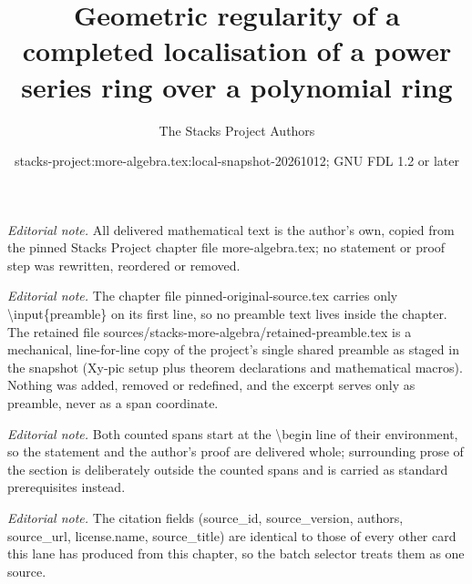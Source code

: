 \documentclass[10pt,a4paper]{amsart}
\title{Geometric regularity of a completed localisation of a power series ring over a polynomial ring}
\author{The Stacks Project Authors}
\date{stacks-project:more-algebra.tex:local-snapshot-20261012; GNU FDL 1.2 or later}
\theoremstyle{plain}
\theoremstyle{definition}
\theoremstyle{remark}
\numberwithin{equation}{subsection}
\begin{document}
\maketitle
\setcounter{subsection}{1}
\noindent\textit{Editorial note.} All delivered mathematical text is the author's own, copied from the pinned Stacks Project chapter file more-algebra.tex; no statement or proof step was rewritten, reordered or removed.\par\medskip
\noindent\textit{Editorial note.} The chapter file pinned-original-source.tex carries only \textbackslash{}input\{preamble\} on its first line, so no preamble text lives inside the chapter. The retained file sources/stacks-more-algebra/retained-preamble.tex is a mechanical, line-for-line copy of the project's single shared preamble as staged in the snapshot (Xy-pic setup plus theorem declarations and mathematical macros). Nothing was added, removed or redefined, and the excerpt serves only as preamble, never as a span coordinate.\par\medskip
\noindent\textit{Editorial note.} Both counted spans start at the \textbackslash{}begin line of their environment, so the statement and the author's proof are delivered whole; surrounding prose of the section is deliberately outside the counted spans and is carried as standard prerequisites instead.\par\medskip
\noindent\textit{Editorial note.} The citation fields (source\_id, source\_version, authors, source\_url, license.name, source\_title) are identical to those of every other card this lane has produced from this chapter, so the batch selector treats them as one source.\par\medskip
\end{document}
